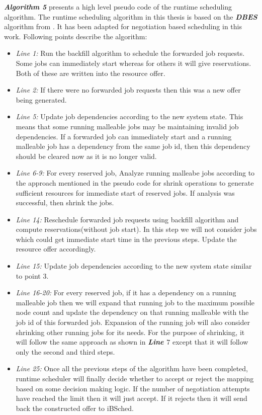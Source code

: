 \textbf{\textit{Algorithm 5}} presents a high level pseudo code of the runtime scheduling algorithm. The runtime scheduling algorithm in this thesis is based on the \textbf{\textit{DBES}} algorithm from \cite{laxmikant}. It has been adapted for negotiation based scheduling in this work. Following points describe the algorithm:
\begin{itemize}
\item \textit{Line 1:} Run the backfill algorithm to schedule the forwarded job requests. Some jobs can immediately start whereas for others it will give reservations. Both of these are written into the resource offer.
\item \textit{Line 2:} If there were no forwarded job requests then this was a new offer being generated.
\item \textit{Line 5:} Update job dependencies according to the new system state. This means that some running malleable jobs may be maintaining invalid job dependencies. If a forwarded job can immediately start and a running malleable job has a dependency from the same job id, then this dependency should be cleared now as it is no longer valid. 
\item \textit{Line 6-9:} For every reserved job, Analyze running malleabe jobs according to the approach mentioned in the pseudo code for shrink operations to generate sufficient resources for immediate start of reserved jobs. If analysis was successful, then shrink the jobs.
\item \textit{Line 14:} Reschedule forwarded job requests using backfill algorithm and compute reservations(without job start). In this step we will not consider jobs which could get immediate start time in the previous steps. Update the resource offer accordingly.
\item \textit{Line 15:} Update job dependencies according to the new system state similar to point $3$.
\item \textit{Line 16-20:} For every reserved job, if it has a dependency on a running malleable job then we will expand that running job to the maximum possible node count and update the dependency on that running malleable with the job id of this forwarded job. Expansion of the running job will also consider shrinking other running jobs for its needs. For the purpose of shrinking, it will follow the same approach as shown in \textbf{\textit{Line $7$}} except that it will follow only the second and third steps.
\item \textit{Line 25:} Once all the previous steps of the algorithm have been completed, runtime scheduler will finally decide whether to accept or reject the mapping based on some decision making logic. If the number of negotiation attempts have reached the limit then it will just accept. If it rejects then it will send back the constructed offer to iBSched.
\end{itemize}
